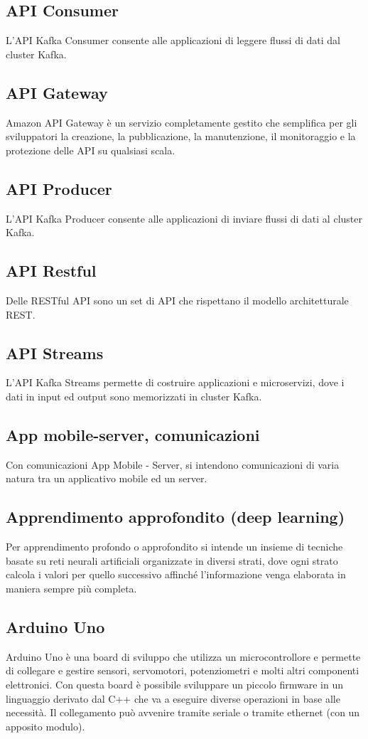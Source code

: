 \subsection{API Consumer}  L'API Kafka Consumer consente alle applicazioni di leggere flussi di dati dal cluster Kafka.
\subsection{API Gateway}  Amazon API Gateway è un servizio completamente gestito che semplifica per gli sviluppatori la creazione, la pubblicazione, la manutenzione, il monitoraggio e la protezione delle API su qualsiasi scala.
\subsection{API Producer}  L'API Kafka Producer consente alle applicazioni di inviare flussi di dati al cluster Kafka.
\subsection{API Restful}  Delle RESTful API sono un set di API che rispettano il modello architetturale REST.
\subsection{API Streams}  L'API Kafka Streams permette di costruire applicazioni e microservizi, dove i dati in input ed output sono memorizzati in cluster Kafka.
\subsection{App mobile-server, comunicazioni}  Con comunicazioni App Mobile - Server, si intendono comunicazioni di varia natura tra un applicativo mobile ed un server.
\subsection{Apprendimento approfondito (deep learning)}  Per apprendimento profondo o approfondito si intende un insieme di tecniche basate su reti neurali artificiali organizzate in diversi strati, dove ogni strato calcola i valori per quello successivo affinché l'informazione venga elaborata in maniera sempre più completa.
\subsection{Arduino Uno}  Arduino Uno è una board di sviluppo che utilizza un microcontrollore e permette di collegare e gestire sensori, servomotori, potenziometri e molti altri componenti elettronici. Con questa board è possibile sviluppare un piccolo firmware in un linguaggio derivato dal C++ che va a eseguire diverse operazioni in base alle necessità. Il collegamento può avvenire tramite seriale o tramite ethernet (con un apposito modulo).
